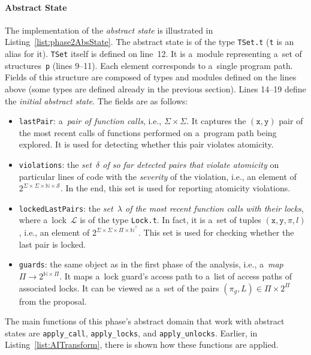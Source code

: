 \paragraph{Abstract State}
The implementation of the \emph{abstract state} is illustrated in Listing~\ref{list:phase2AbsState}. The abstract state is of the type \texttt{TSet.t} (\texttt{t} is an alias for it). \texttt{TSet} itself is defined on line~12. It is a~module representing a~set of structures~\texttt{p} (lines 9--11). Each element corresponds to a~single program path. Fields of this structure are composed of types and modules defined on the lines above (some types are defined already in the previous section). Lines 14--19 define the \emph{initial abstract state}. The fields are as follows:
\begin{itemize}
    \item \texttt{lastPair}: a~\emph{pair of function calls}, i.e., $ \Sigma \times \Sigma $. It captures the $ (\mathtt{x}, \mathtt{y}) $ pair of the most recent calls of functions performed on a~program path being explored. It is used for detecting whether this pair violates atomicity.
    
    \item \texttt{violations}: the \emph{set~$ \delta $ of so far detected pairs that violate atomicity} on particular lines of code with the \emph{severity} of the violation, i.e., an element of $ 2^{\Sigma \times \Sigma \times \mathbb{N} \times \mathcal{S}} $. In the end, this set is used for reporting atomicity violations.
    
    \item \texttt{lockedLastPairs}: the \emph{set~$ \lambda $ of the most recent function calls with their locks}, where a~lock~$ \mathcal{L} $ is of the type \texttt{Lock.t}. In fact, it is a~set of tuples $ (\mathtt{x}, \mathtt{y}, \pi, l) $, i.e., an element of $ 2^{\Sigma \times \Sigma \times \Pi \times \mathbb{N}^\top} $. This set is used for checking whether the last pair is locked.
    
    \item \texttt{guards}: the same object as in the first phase of the analysis, i.e., a~\emph{map} $ \Pi \rightarrow 2^{\mathbb{N} \times \Pi} $. It maps a~lock guard's access path to a~list of access paths of associated locks. It can be viewed as a~set of the pairs $ (\pi_g, L) \in \Pi \times 2^\Pi $ from the proposal.
\end{itemize}

The main functions of this phase's abstract domain that work with abstract states are \texttt{apply\_call}, \texttt{apply\_locks}, and \texttt{apply\_unlocks}. Earlier, in Listing~\ref{list:AITransform}, there is shown how these functions are applied.

